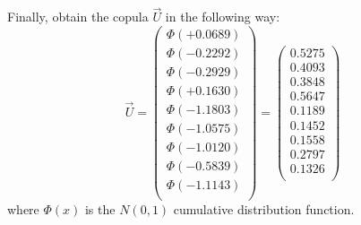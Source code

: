 \documentclass[a4paper,12pt,final]{article}
\begin{document}
Finally, obtain the copula $\vec{U}$ in the following way:
{\small
\begin{displaymath}
\vec{U} 
=
\left(
\begin{array}{c}
\Phi(+0.0689) \\
\Phi(-0.2292) \\
\Phi(-0.2929) \\
\Phi(+0.1630) \\
\Phi(-1.1803) \\
\Phi(-1.0575) \\
\Phi(-1.0120) \\
\Phi(-0.5839) \\
\Phi(-1.1143) \\
\end{array}
\right) 
=
\left(
\begin{array}{c}
   0.5275 \\
   0.4093 \\
   0.3848 \\
   0.5647 \\
   0.1189 \\
   0.1452 \\
   0.1558 \\
   0.2797 \\
   0.1326 \\
\end{array}
\right) 
\end{displaymath}
}
where $\Phi(x)$ is the $N(0,1)$ cumulative distribution function.
\end{document}
